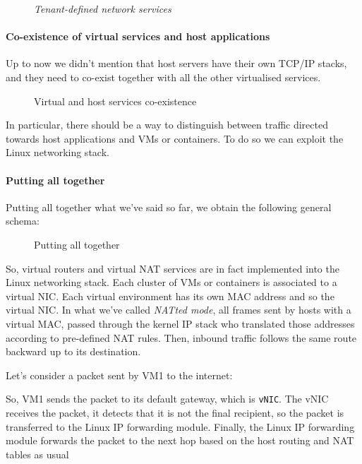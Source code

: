 \begin{figure}[ht!]
    \centering
    \caption{\emph{Tenant-defined network services}}
\end{figure}

\paragraph{Co-existence of virtual services and host applications}
Up to now we didn't mention that host servers have their own TCP/IP stacks, and
they need to co-exist together with all the other virtualised services.

\begin{figure}[h!]
    \centering
    \caption{Virtual and host services co-existence}
\end{figure}

\noindent
In particular, there should be a way to distinguish between traffic directed towards
host applications and VMs or containers. To do so we can exploit the Linux
networking stack.

\paragraph{Putting all together}
Putting all together what we've said so far, we obtain the following general schema:

\begin{figure}[h!]
    \centering
    \caption{Putting all together}
\end{figure}

\noindent
So, virtual routers and virtual NAT services are in fact implemented into the
Linux networking stack. Each cluster of VMs or containers is associated to a
virtual NIC. Each virtual environment has its own MAC address and so the virtual
NIC. In what we've called \emph{NATted mode}, all frames sent by hosts with
a virtual MAC, passed through the kernel IP stack who translated those addresses
according to pre-defined NAT rules. Then, inbound traffic follows the same route
backward up to its destination.

\begin{eg}
    Let's consider a packet sent by VM1 to the internet:

    \begin{figure}[h!]
        \centering
        \hfill
    \end{figure}

    \noindent
    So, VM1 sends the packet to its default gateway, which is \texttt{vNIC}. 
    The vNIC receives the packet, it detects that it is not the final recipient,
    so the packet is transferred to the Linux IP forwarding module. Finally,
    the Linux IP forwarding module forwards the packet to the next hop based on
    the host routing and NAT tables as usual
\end{eg}

